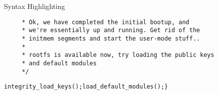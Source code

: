\begin{frame}{Syntax Highlighting}
\begin{verbatim}
	 * Ok, we have completed the initial bootup, and
	 * we're essentially up and running. Get rid of the
	 * initmem segments and start the user-mode stuff..
	 *
	 * rootfs is available now, try loading the public keys
	 * and default modules
	 */\end{verbatim}\leavevmode\newline\newline\tab\color{Aquamarine}\verb$integrity_load_keys$\color{Fuchsia}\verb$($\color{Fuchsia}\verb$)$\color{Fuchsia}\verb$;$\newline\tab\color{Aquamarine}\verb$load_default_modules$\color{Fuchsia}\verb$($\color{Fuchsia}\verb$)$\color{Fuchsia}\verb$;$\newline\color{Fuchsia}\verb$}$\newline
\end{frame}
